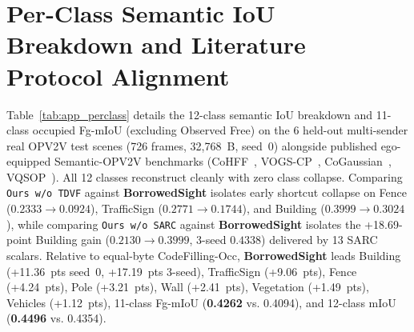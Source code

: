 \documentclass[journal]{IEEEtran}
\begin{document}
\section{Per-Class Semantic IoU Breakdown and Literature Protocol Alignment}
\label{app:perclass}

Table~\ref{tab:app_perclass} details the 12-class semantic IoU breakdown and 11-class occupied Fg-mIoU (excluding Observed Free) on the 6 held-out multi-sender real OPV2V test scenes (726 frames, 32,768~B, seed~0) alongside published ego-equipped Semantic-OPV2V benchmarks (CoHFF~\cite{song2024cohff}, VOGS-CP~\cite{chen2026vogscp}, CoGaussian~\cite{verma2026cogaussian}, VQSOP~\cite{li2026vqsop}). All 12 classes reconstruct cleanly with zero class collapse. Comparing \texttt{Ours w/o TDVF} against \textbf{BorrowedSight} isolates early shortcut collapse on Fence ($0.2333 \to 0.0924$), TrafficSign ($0.2771 \to 0.1744$), and Building ($0.3999 \to 0.3024$), while comparing \texttt{Ours w/o SARC} against \textbf{BorrowedSight} isolates the +18.69-point Building gain ($0.2130 \to 0.3999$, 3-seed $0.4338$) delivered by 13 SARC scalars. Relative to equal-byte CodeFilling-Occ, \textbf{BorrowedSight} leads Building (+11.36~pts seed~0, +17.19~pts 3-seed), TrafficSign (+9.06~pts), Fence (+4.24~pts), Pole (+3.21~pts), Wall (+2.41~pts), Vegetation (+1.49~pts), Vehicles (+1.12~pts), 11-class Fg-mIoU (\textbf{0.4262} vs. 0.4094), and 12-class mIoU (\textbf{0.4496} vs. 0.4354).
\end{document}
